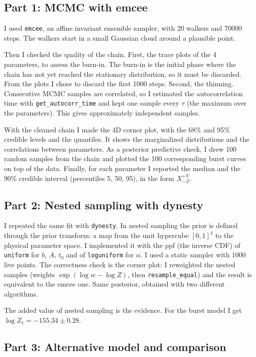 \documentclass[11pt]{article}
\begin{document}
\subsection*{Part 1: MCMC with emcee}

I used \texttt{emcee}, an affine invariant ensemble sampler, with 20 walkers and 70000 steps. The walkers start in a small Gaussian cloud around a plausible point.

Then I checked the quality of the chain. First, the trace plots of the 4 parameters, to assess the burn-in. The burn-in is the initial phase where the chain has not yet reached the stationary distribution, so it must be discarded. From the plots I chose to discard the first 1000 steps. Second, the thinning. Consecutive MCMC samples are correlated, so I estimated the autocorrelation time with \texttt{get\_autocorr\_time} and kept one sample every $\tau$ (the maximum over the parameters). This gives approximately independent samples.

With the cleaned chain I made the 4D corner plot, with the 68\% and 95\% credible levels and the quantiles. It shows the marginalized distributions and the correlations between parameters. As a posterior predictive check, I drew 100 random samples from the chain and plotted the 100 corresponding burst curves on top of the data. Finally, for each parameter I reported the median and the 90\% credible interval (percentiles 5, 50, 95), in the form $X^{+Y}_{-Z}$.

\subsection*{Part 2: Nested sampling with dynesty}

I repeated the same fit with \texttt{dynesty}. In nested sampling the prior is defined through the prior transform: a map from the unit hypercube $[0,1]^4$ to the physical parameter space. I implemented it with the ppf (the inverse CDF) of \texttt{uniform} for $b$, $A$, $t_0$ and of \texttt{loguniform} for $\alpha$. I used a static sampler with 1000 live points. The correctness check is the corner plot: I reweighted the nested samples (weights $\exp(\log w - \log Z)$, then \texttt{resample\_equal}) and the result is equivalent to the emcee one. Same posterior, obtained with two different algorithms.

The added value of nested sampling is the evidence. For the burst model I get $\log Z_1 = -155.34 \pm 0.28$.

\subsection*{Part 3: Alternative model and comparison}
\end{document}
